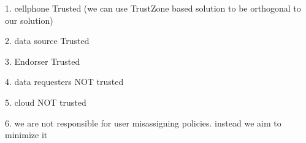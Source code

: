 1. cellphone Trusted (we can use TrustZone based solution to be orthogonal to our solution)

2. data source Trusted

3. Endorser Trusted

4. data requesters NOT trusted

5. cloud NOT trusted

6. we are not responsible for user misassigning policies. instead we aim to minimize it
